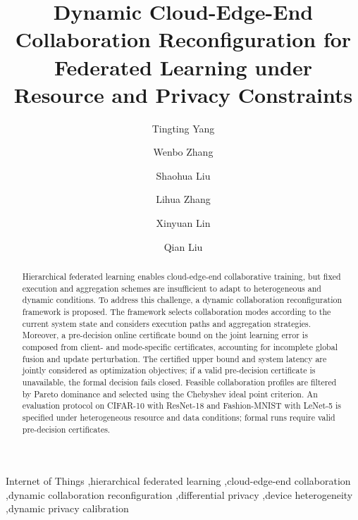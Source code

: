 \documentclass[5p,times]{elsarticle}
\theoremstyle{plain}
\theoremstyle{definition}
\theoremstyle{remark}
\begin{document}
\begin{frontmatter}

\title{Dynamic Cloud-Edge-End Collaboration Reconfiguration for Federated Learning under Resource and Privacy Constraints}

\author[bupt1,bupt2,bupt3]{Tingting Yang}
\author[bupt1,bupt2,bupt3]{Wenbo Zhang}
\author[bupt1,bupt2,bupt3]{Shaohua Liu}
\author[bupt1,bupt2,bupt3]{Lihua Zhang}
\author[bupt1,bupt2,bupt3]{Xinyuan Lin}
\author[bupt1,bupt2,bupt3]{Qian Liu}




\begin{abstract}
Hierarchical federated learning enables cloud-edge-end collaborative training, but fixed execution and aggregation schemes are insufficient to adapt to heterogeneous and dynamic conditions.
To address this challenge, a dynamic collaboration reconfiguration framework is proposed.
The framework selects collaboration modes according to the current system state and considers execution paths and aggregation strategies.
Moreover, a pre-decision online certificate bound on the joint learning error is composed from client- and mode-specific certificates, accounting for incomplete global fusion and update perturbation.
The certified upper bound and system latency are jointly considered as optimization objectives; if a valid pre-decision certificate is unavailable, the formal decision fails closed.
Feasible collaboration profiles are filtered by Pareto dominance and selected using the Chebyshev ideal point criterion.
An evaluation protocol on CIFAR-10 with ResNet-18 and Fashion-MNIST with LeNet-5 is specified under heterogeneous resource and data conditions; formal runs require valid pre-decision certificates.
\end{abstract}

\begin{keyword} 
Internet of Things \sep hierarchical federated learning \sep cloud-edge-end collaboration \sep dynamic collaboration reconfiguration \sep differential privacy \sep device heterogeneity \sep dynamic privacy calibration
\end{keyword}

\end{frontmatter}
\end{document}
